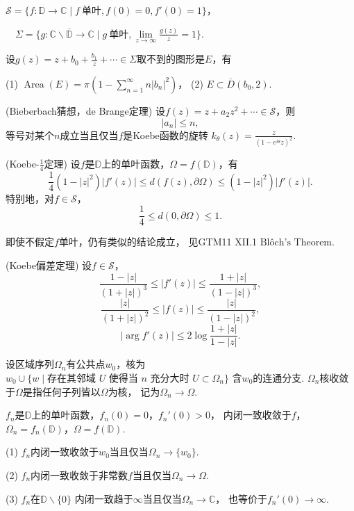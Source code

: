 \begin{definition}$\mathcal{S}=\{f\colon\mathbb{D}\rightarrow\mathbb{C}
\mid f\ \text{单叶},f(0)=0,f'(0)=1\}$，

\qquad\qquad\ \ $\Sigma=\{g\colon\mathbb{C}\backslash\overline{\mathbb{D}}
\rightarrow\mathbb{C}
\mid g\ \text{单叶},\lim\limits_{z\rightarrow\infty}\frac{g(z)}{z}=1\}$.\end{definition}

\begin{proposition}设$g(z)=z+b_0+\frac{b_1}{z}+\cdots\in\Sigma$取不到的图形是$E$，有

(1) $\operatorname{Area}(E)=\pi(1-\sum\limits_{n=1}^\infty n|b_n|^2)$，
\quad(2) $E\subset\overline{D}(b_0,2)$.\end{proposition}

\begin{proposition}(Bieberbach猜想，de Brange定理) 
设$f(z)=z+a_2z^2+\cdots\in\mathcal{S}$，则
$$|a_n|\leq n,$$
等号对某个$n$成立当且仅当$f$是Koebe函数的旋转
$\displaystyle{k_\theta(z)=\frac{z}{(1-e^{i\theta}z)^2}}$.\end{proposition}

\begin{proposition}(Koebe-$\frac{1}{4}$定理) 
设$f$是$\mathbb{D}$上的单叶函数，$\Omega=f(\mathbb{D})$，有
$$\frac{1}{4}(1-|z|^2)|f'(z)|\leq d(f(z),\partial \Omega)\leq(1-|z|^2)|f'(z)|.$$
特别地，对$f\in\mathcal{S}$，$$\frac{1}{4}\leq d(0,\partial\Omega)\leq1.$$\end{proposition}

\begin{remark}即使不假定$f$单叶，仍有类似的结论成立，
见GTM11 XII.1 $\text{Blôch's Theorem}$.\end{remark}

\begin{proposition}(Koebe偏差定理) 设$f\in\mathcal{S}$，
$$\frac{1-|z|}{(1+|z|)^3}\leq|f'(z)|\leq\frac{1+|z|}{(1-|z|)^3},$$
$$\frac{|z|}{(1+|z|)^2}\leq|f(z)|\leq\frac{|z|}{(1-|z|)^2},$$
$$|\arg f'(z)|\leq2\log\frac{1+|z|}{1-|z|}.$$\end{proposition}

\begin{definition}设区域序列$\Omega_n$有公共点$w_0$，核为$w_0\cup
\{w\mid\text{存在其邻域 }U\text{ 使得当 }n\text{ 充分大时 }U\subset\Omega_n\}$
含$w_0$的连通分支. $\Omega_n$核收敛于$\Omega$是指任何子列皆以$\Omega$为核，
记为$\Omega_n\rightarrow\Omega$.\end{definition}

\begin{proposition}$f_n$是$\mathbb{D}$上的单叶函数，$f_n(0)=0$，$f_n'(0)>0$，
内闭一致收敛于$f$，$\Omega_n=f_n(\mathbb{D})$，$\Omega=f(\mathbb{D})$.

(1) $f_n$内闭一致收敛于$w_0$当且仅当$\Omega_n\rightarrow\{w_0\}$.

(2) $f_n$内闭一致收敛于非常数$f$当且仅当$\Omega_n\rightarrow\Omega$.

(3) $f_n$在$\mathbb{D}\backslash\{0\}$
内闭一致趋于$\infty$当且仅当$\Omega_n\rightarrow\mathbb{C}$，
也等价于$f_n'(0)\rightarrow\infty$.\end{proposition}

